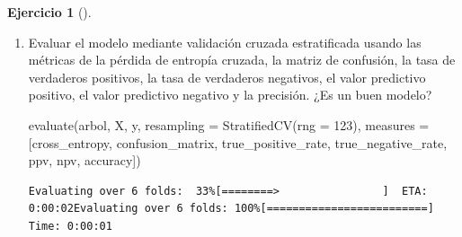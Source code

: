 \documentclass[
  a4paper,
]{scrreport}
\newenvironment{Shaded}{\begin{snugshade}}{\end{snugshade}}
\newcommand{\FloatTok}[1]{\textcolor[rgb]{0.68,0.00,0.00}{#1}}
\newcommand{\FunctionTok}[1]{\textcolor[rgb]{0.28,0.35,0.67}{#1}}
\newcommand{\NormalTok}[1]{\textcolor[rgb]{0.00,0.23,0.31}{#1}}
\newcommand{\OperatorTok}[1]{\textcolor[rgb]{0.37,0.37,0.37}{#1}}
\theoremstyle{definition}
\newtheorem{exercise}{Ejercicio}[chapter]
\theoremstyle{remark}
\begin{document}
\begin{exercise}[]
\begin{enumerate}
\begin{tcolorbox}
  \end{tcolorbox}
\item
  Evaluar el modelo mediante validación cruzada estratificada usando las
  métricas de la pérdida de entropía cruzada, la matriz de confusión, la
  tasa de verdaderos positivos, la tasa de verdaderos negativos, el
  valor predictivo positivo, el valor predictivo negativo y la
  precisión. ¿Es un buen modelo?

  \begin{tcolorbox}[enhanced jigsaw, left=2mm, colback=white, coltitle=black, opacitybacktitle=0.6, titlerule=0mm, breakable, bottomrule=.15mm, toptitle=1mm, bottomtitle=1mm, colbacktitle=quarto-callout-tip-color!10!white, opacityback=0, rightrule=.15mm, title=\textcolor{quarto-callout-tip-color}{\faLightbulb}\hspace{0.5em}{Solución}, colframe=quarto-callout-tip-color-frame, arc=.35mm, leftrule=.75mm, toprule=.15mm]

\begin{Shaded}
\begin{Highlighting}[]
\FunctionTok{evaluate}\NormalTok{(arbol, X, y, resampling }\OperatorTok{=} \FunctionTok{StratifiedCV}\NormalTok{(rng }\OperatorTok{=} \FloatTok{123}\NormalTok{), measures }\OperatorTok{=}\NormalTok{ [cross\_entropy, confusion\_matrix, true\_positive\_rate, true\_negative\_rate, ppv, npv, accuracy])}
\end{Highlighting}
\end{Shaded}

\begin{verbatim}
Evaluating over 6 folds:  33%[========>                ]  ETA: 0:00:02Evaluating over 6 folds: 100%[=========================] Time: 0:00:01
\end{verbatim}


\end{tcolorbox}
\end{enumerate}
\end{exercise}
\end{document}
